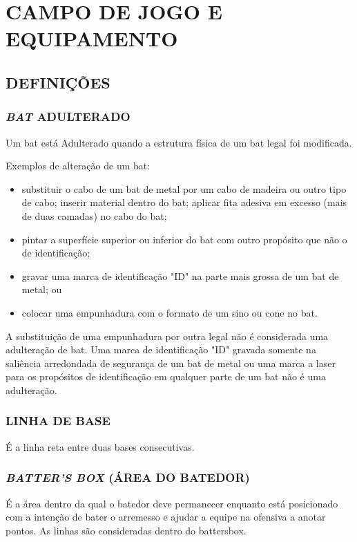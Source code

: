 \chapter{CAMPO DE JOGO E EQUIPAMENTO}

\minitoc%

\section{DEFINIÇÕES}
\subsection{\textit{BAT} ADULTERADO}

Um \gls{bat} está Adulterado quando a estrutura física de um \gls{bat} legal foi modificada.

Exemplos de alteração de um \gls{bat}:
\begin{exemplo}
\begin{itemize}
	\item substituir o cabo de um \gls{bat} de metal por um cabo de madeira ou outro tipo de cabo; inserir material dentro do \gls{bat}; aplicar fita adesiva em excesso (mais de duas camadas) no cabo do \gls{bat};
	\item pintar a superfície superior ou inferior do \gls{bat} com outro propósito que não o de identificação;
	\item gravar uma marca de identificação "ID" na parte mais grossa de um \gls{bat} de metal; ou
	\item colocar uma empunhadura com o formato de um sino ou cone no \gls{bat}.
\end{itemize}
\end{exemplo}

 A substituição de uma empunhadura por outra legal não é considerada uma adulteração de \gls{bat}. Uma marca de identificação "ID" gravada  somente na saliência arredondada de segurança de um \gls{bat} de metal ou uma  marca a laser para os propósitos de identificação em qualquer parte de um \gls{bat} não é uma adulteração.

\subsection{LINHA DE BASE}
 É a linha reta entre duas bases consecutivas.

\subsection{\textit{BATTER'S BOX} (ÁREA DO BATEDOR)}
 É a área dentro da qual o batedor deve permanecer enquanto está posicionado com a intenção de bater o arremesso e ajudar a equipe na ofensiva a anotar pontos. As linhas são consideradas dentro do \gls{battersbox}.

